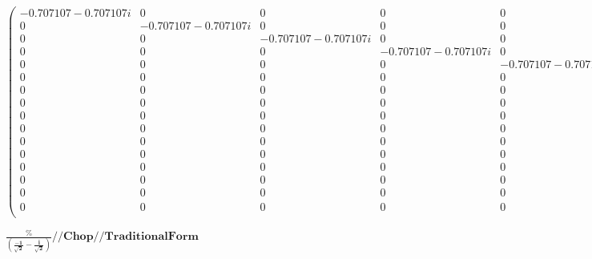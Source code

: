 \documentclass{article}
\begin{document}
\begin{doublespace}
\noindent\(\left(
\begin{array}{cccccccccccccccc}
 -0.707107-0.707107 i & 0 & 0 & 0 & 0 & 0 & 0 & 0 & 0 & 0 & 0 & 0 & 0 & 0 & 0 & 0 \\
 0 & -0.707107-0.707107 i & 0 & 0 & 0 & 0 & 0 & 0 & 0 & 0 & 0 & 0 & 0 & 0 & 0 & 0 \\
 0 & 0 & -0.707107-0.707107 i & 0 & 0 & 0 & 0 & 0 & 0 & 0 & 0 & 0 & 0 & 0 & 0 & 0 \\
 0 & 0 & 0 & -0.707107-0.707107 i & 0 & 0 & 0 & 0 & 0 & 0 & 0 & 0 & 0 & 0 & 0 & 0 \\
 0 & 0 & 0 & 0 & -0.707107-0.707107 i & 0 & 0 & 0 & 0 & 0 & 0 & 0 & 0 & 0 & 0 & 0 \\
 0 & 0 & 0 & 0 & 0 & -0.707107-0.707107 i & 0 & 0 & 0 & 0 & 0 & 0 & 0 & 0 & 0 & 0 \\
 0 & 0 & 0 & 0 & 0 & 0 & -0.707107-0.707107 i & 0 & 0 & 0 & 0 & 0 & 0 & 0 & 0 & 0 \\
 0 & 0 & 0 & 0 & 0 & 0 & 0 & -0.707107-0.707107 i & 0 & 0 & 0 & 0 & 0 & 0 & 0 & 0 \\
 0 & 0 & 0 & 0 & 0 & 0 & 0 & 0 & -0.707107-0.707107 i & 0 & 0 & 0 & 0 & 0 & 0 & 0 \\
 0 & 0 & 0 & 0 & 0 & 0 & 0 & 0 & 0 & -0.707107-0.707107 i & 0 & 0 & 0 & 0 & 0 & 0 \\
 0 & 0 & 0 & 0 & 0 & 0 & 0 & 0 & 0 & 0 & -0.707107-0.707107 i & 0 & 0 & 0 & 0 & 0 \\
 0 & 0 & 0 & 0 & 0 & 0 & 0 & 0 & 0 & 0 & 0 & -0.707107-0.707107 i & 0 & 0 & 0 & 0 \\
 0 & 0 & 0 & 0 & 0 & 0 & 0 & 0 & 0 & 0 & 0 & 0 & -0.707107-0.707107 i & 0 & 0 & 0 \\
 0 & 0 & 0 & 0 & 0 & 0 & 0 & 0 & 0 & 0 & 0 & 0 & 0 & -0.707107-0.707107 i & 0 & 0 \\
 0 & 0 & 0 & 0 & 0 & 0 & 0 & 0 & 0 & 0 & 0 & 0 & 0 & 0 & -0.653281-0.653281 i & 0.270598\, +0.270598 i \\
 0 & 0 & 0 & 0 & 0 & 0 & 0 & 0 & 0 & 0 & 0 & 0 & 0 & 0 & -0.270598-0.270598 i & -0.653281-0.653281 i \\
\end{array}
\right)\)
\end{doublespace}

\begin{doublespace}
\noindent\(\pmb{\frac{\%}{\left(\frac{-1}{\sqrt{2}}-\frac{i}{\sqrt{2}}\right)}\text{//}\text{Chop}\text{//}\text{TraditionalForm}}\)
\end{doublespace}
\end{document}
